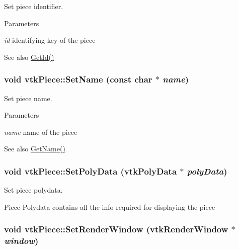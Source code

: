 Set piece identifier. 


\begin{DoxyParams}{Parameters}
\item[{\em id}]identifying key of the piece \end{DoxyParams}
\begin{DoxySeeAlso}{See also}
\hyperlink{classvtkPiece_a2c1faf03ee84364ed939a330d58ab2a6}{GetId()} 
\end{DoxySeeAlso}
\hypertarget{classvtkPiece_ad7a95670a66a62e24e7685a6b8f6dafe}{
\subsubsection[{SetName}]{\setlength{\rightskip}{0pt plus 5cm}void vtkPiece::SetName (const char $\ast$ {\em name})}}
\label{classvtkPiece_ad7a95670a66a62e24e7685a6b8f6dafe}


Set piece name. 


\begin{DoxyParams}{Parameters}
\item[{\em name}]name of the piece \end{DoxyParams}
\begin{DoxySeeAlso}{See also}
\hyperlink{classvtkPiece_aaaf5a6463ed77fff3a6ece4612db0e13}{GetName()} 
\end{DoxySeeAlso}
\hypertarget{classvtkPiece_a0efb6741a7e3251558b940a92bed9267}{
\subsubsection[{SetPolyData}]{\setlength{\rightskip}{0pt plus 5cm}void vtkPiece::SetPolyData (vtkPolyData $\ast$ {\em polyData})}}
\label{classvtkPiece_a0efb6741a7e3251558b940a92bed9267}


Set piece polydata. 

Piece Polydata contains all the info required for displaying the piece \hypertarget{classvtkPiece_ad34b59d8e6996866b71bb4abb6c46fdb}{
\subsubsection[{SetRenderWindow}]{\setlength{\rightskip}{0pt plus 5cm}void vtkPiece::SetRenderWindow (vtkRenderWindow $\ast$ {\em window})}}
\label{classvtkPiece_ad34b59d8e6996866b71bb4abb6c46fdb}


